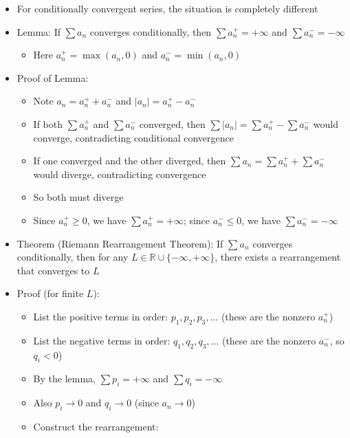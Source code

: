 \documentclass[
  10pt,
  letterpaper,
]{scrbook}
\providecommand{\tightlist}{%
  \setlength{\itemsep}{0pt}\setlength{\parskip}{0pt}}
\begin{document}
\begin{itemize}
\tightlist
\item
  For conditionally convergent series, the situation is completely
  different
\item
  Lemma: If \(\sum a_n\) converges conditionally, then
  \(\sum a_n^+ = +\infty\) and \(\sum a_n^- = -\infty\)

  \begin{itemize}
  \tightlist
  \item
    Here \(a_n^+ = \max(a_n, 0)\) and \(a_n^- = \min(a_n, 0)\)
  \end{itemize}
\item
  Proof of Lemma:

  \begin{itemize}
  \tightlist
  \item
    Note \(a_n = a_n^+ + a_n^-\) and \(|a_n| = a_n^+ - a_n^-\)
  \item
    If both \(\sum a_n^+\) and \(\sum a_n^-\) converged, then
    \(\sum |a_n| = \sum a_n^+ - \sum a_n^-\) would converge,
    contradicting conditional convergence
  \item
    If one converged and the other diverged, then
    \(\sum a_n = \sum a_n^+ + \sum a_n^-\) would diverge, contradicting
    convergence
  \item
    So both must diverge
  \item
    Since \(a_n^+ \geq 0\), we have \(\sum a_n^+ = +\infty\); since
    \(a_n^- \leq 0\), we have \(\sum a_n^- = -\infty\)
  \end{itemize}
\item
  Theorem (Riemann Rearrangement Theorem): If \(\sum a_n\) converges
  conditionally, then for any
  \(L \in \mathbb{R} \cup \{-\infty, +\infty\}\), there exists a
  rearrangement that converges to \(L\)
\item
  Proof (for finite \(L\)):

  \begin{itemize}
  \tightlist
  \item
    List the positive terms in order: \(p_1, p_2, p_3, \ldots\) (these
    are the nonzero \(a_n^+\))
  \item
    List the negative terms in order: \(q_1, q_2, q_3, \ldots\) (these
    are the nonzero \(a_n^-\), so \(q_i < 0\))
  \item
    By the lemma, \(\sum p_i = +\infty\) and \(\sum q_i = -\infty\)
  \item
    Also \(p_i \to 0\) and \(q_i \to 0\) (since \(a_n \to 0\))
  \item
    Construct the rearrangement:


\end{itemize}
\end{itemize}
\end{document}
